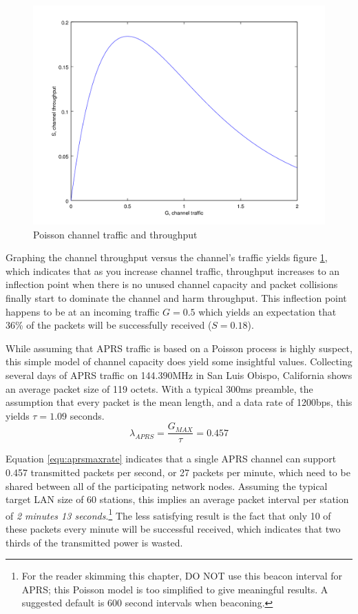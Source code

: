 \begin{figure}
	\centering
	\includegraphics[width=1.0\textwidth]{src/octave/poissonthroughput}
	\caption{Poisson channel traffic and throughput}
	\label{fig:SGpoisson}
\end{figure}
Graphing the channel throughput versus the channel's traffic yields figure 
\ref{fig:SGpoisson}, which indicates that as you increase channel traffic, 
throughput increases to an inflection point when there is no unused channel capacity
and packet collisions finally start to dominate
the channel and harm throughput. This inflection point happens to be at
an incoming traffic $G = 0.5$ which yields an expectation that 36\% of the packets
will be successfully received ($S = 0.18$).

While assuming that APRS traffic is based on a Poisson process is 
highly suspect, this simple model of channel capacity does yield some insightful 
values. 
Collecting several days of APRS traffic on 144.390MHz in San Luis Obispo, California
shows an average packet size of 119 octets. With a typical 300ms preamble,
the assumption that every packet is the mean length,
and a data rate of 1200bps, this yields $\tau = 1.09$ seconds.
\begin{equation}
	\lambda_{APRS} = \frac{G_{MAX}}{\tau} = 0.457
	\label{equ:aprsmaxrate}
\end{equation}

Equation \ref{equ:aprsmaxrate} indicates that a single APRS channel can support
0.457 transmitted packets per second, or
27 packets per minute, which need to be shared between
all of the participating network nodes.
Assuming the typical target LAN size of 60 stations, 
this implies an average packet interval per station
of \emph{2 minutes 13 seconds}.\footnote{For the reader skimming this chapter, DO NOT
	use this beacon interval for APRS; this Poisson model is too simplified to give
meaningful results. A suggested default is 600 second intervals when beaconing.}
The less satisfying result is the fact that only 10 of these packets every minute will be
successful received, which indicates that
two thirds of the transmitted power is wasted.

